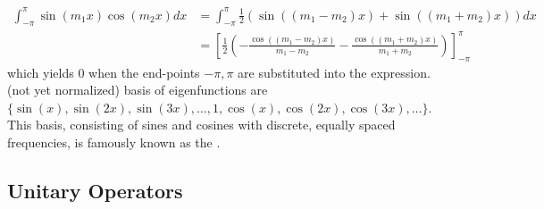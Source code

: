 \begin{solution}
{\begin{align*}
\int_{-\pi}^{\pi} \sin(m_1 x)\cos(m_2 x) dx &= \int_{-\pi}^{\pi} \frac{1}{2} (\sin((m_1 - m_2)x) + \sin((m_1 + m_2)x)) dx \\
&= [\frac{1}{2} (-\frac{\cos((m_1 - m_2)x)}{m_1 - m_2} - \frac{\cos((m_1 + m_2)x)}{m_1 + m_2})]_{-\pi}^{\pi} 
\end{align*}
which yields $0$ when the end-points $-\pi, \pi$ are substituted into the expression.} (not yet normalized) basis of eigenfunctions are $\{\sin(x), \sin(2x), \sin(3x), \ldots, 1, \cos(x), \cos(2x), \cos(3x), \ldots\}$. This basis, consisting of sines and cosines with discrete, equally spaced frequencies, is famously known as the .
\end{solution}

\subsection{Unitary Operators}

